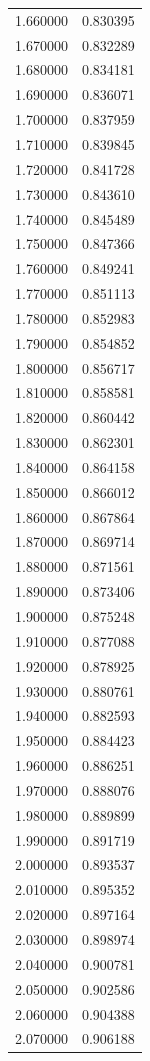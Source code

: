 \begin{tabular}{rr}
1.660000 & 0.830395 \\
1.670000 & 0.832289 \\
1.680000 & 0.834181 \\
1.690000 & 0.836071 \\
1.700000 & 0.837959 \\
1.710000 & 0.839845 \\
1.720000 & 0.841728 \\
1.730000 & 0.843610 \\
1.740000 & 0.845489 \\
1.750000 & 0.847366 \\
1.760000 & 0.849241 \\
1.770000 & 0.851113 \\
1.780000 & 0.852983 \\
1.790000 & 0.854852 \\
1.800000 & 0.856717 \\
1.810000 & 0.858581 \\
1.820000 & 0.860442 \\
1.830000 & 0.862301 \\
1.840000 & 0.864158 \\
1.850000 & 0.866012 \\
1.860000 & 0.867864 \\
1.870000 & 0.869714 \\
1.880000 & 0.871561 \\
1.890000 & 0.873406 \\
1.900000 & 0.875248 \\
1.910000 & 0.877088 \\
1.920000 & 0.878925 \\
1.930000 & 0.880761 \\
1.940000 & 0.882593 \\
1.950000 & 0.884423 \\
1.960000 & 0.886251 \\
1.970000 & 0.888076 \\
1.980000 & 0.889899 \\
1.990000 & 0.891719 \\
2.000000 & 0.893537 \\
2.010000 & 0.895352 \\
2.020000 & 0.897164 \\
2.030000 & 0.898974 \\
2.040000 & 0.900781 \\
2.050000 & 0.902586 \\
2.060000 & 0.904388 \\
2.070000 & 0.906188 \\

\end{tabular}

